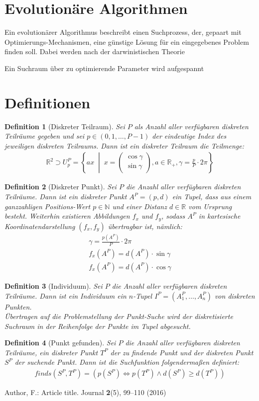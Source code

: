 \documentclass[12pt,a4paper,oneside]{article}
\newcommand{\R}{\mathbb{R}}
\newcommand{\N}{\mathbb{N}}
\newcommand\pmat[1]{\ensuremath{\begin{pmatrix}#1\end{pmatrix}}}
\newcommand\set[2]{\ensuremath{\left\{#1\;\middle|\;#2\right\}}}
\newtheorem{definition}{Definition}
\begin{document}
\tableofcontents
\newpage

\section{Evolutionäre Algorithmen}
Ein evolutionärer Algorithmus beschreibt einen Suchprozess, der, gepaart mit Optimierungs-Mechanismen, eine günstige Lösung für ein eingegebenes Problem finden soll. Dabei werden nach der darwinistischen Theorie 

Ein Suchraum über zu optimierende Parameter wird aufgespannt 

\section{Definitionen}

\begin{definition}[Diskreter Teilraum]
Sei $P$ als Anzahl aller verfügbaren diskreten Teilräume gegeben und sei $p\in(0,1,\dots,P-1)$ der eindeutige Index des jeweiligen diskreten Teilraums. Dann ist ein diskreter Teilraum die Teilmenge:
\begin{align}
\R^2 \supset U^P_p = \set{a x}{x=\pmat{\cos{\gamma}\\\sin{\gamma}},a\in\R_+,\gamma = \frac{p}{P} \cdot 2\pi}
\end{align}
\end{definition}
\begin{definition}[Diskreter Punkt]
Sei $P$ die Anzahl aller verfügbaren diskreten Teilräume.
Dann ist ein diskreter Punkt $A^P = (p,d)$ ein Tupel, dass aus einem ganzzahligen Positions-Wert $p\in\N$ und einer Distanz $d\in\R$ vom Ursprung besteht.
Weiterhin existieren Abbildungen $f_x$ und $f_y$, sodass $A^P$ in kartesische Koordinatendarstellung $(f_x,f_y)$ übertragbar ist, nämlich:
\begin{align}
\gamma = \frac{p(A^P)}{P} \cdot 2 \pi\\
f_x(A^P) = d(A^P)\cdot \sin{\gamma}\\
f_x(A^P) = d(A^P)\cdot \cos{\gamma}
\end{align}
\end{definition}
\begin{definition}[Individuum]
Sei $P$ die Anzahl aller verfügbaren diskreten Teilräume.
Dann ist ein Individuum ein $n$-Tupel $I^P=(A^P_1,\dots,A^P_n)$ von diskreten Punkten.\\
Übertragen auf die Problemstellung der Punkt-Suche wird der diskretisierte Suchraum in der Reihenfolge der Punkte im Tupel abgesucht.
\end{definition}
\begin{definition}[Punkt gefunden]
Sei $P$ die Anzahl aller verfügbaren diskreten Teilräume, ein diskreter Punkt $T^P$ der zu findende Punkt und der diskreten Punkt $S^P$ der suchende Punkt.
Dann ist die Suchfunktion folgendermaßen definiert:
\begin{align}
    finds(S^P,T^P)=(p(S^P) \iff p(T^P) \land d(S^P) \geq d(T^P))
\end{align}
\end{definition}

\begin{thebibliography}{8}
Author, F.: Article title. Journal \textbf{2}(5), 99--110 (2016)
\end{thebibliography}
\end{document}
